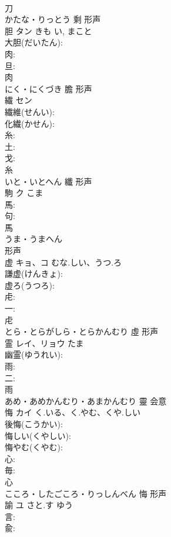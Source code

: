 \documentclass[8pt]{extreport}
\begin{document}
\begin{CJK}{UTF8}{min}
\\	刀	
\\	かたな・りっとう	剩	形声 
\\	胆	タン	きも	い, まこと	
\\	大胆(だいたん): 
\\	肉: 
\\	旦: 
\\	肉	
\\	にく・にくづき	膽	形声 
\\	繊	セン			
\\	繊維(せんい): 
\\	化繊(かせん): 
\\	糸: 
\\	土: 
\\	戈: 
\\	糸	
\\	いと・いとへん	纖	形声 
\\	駒	ク	こま		
\\	馬: 
\\	句: 
\\	馬	
\\	うま・うまへん	
\\	形声 
\\	虚	キョ、コ	むな.しい、うつ.ろ		
\\	謙虚(けんきょ): 
\\	虚ろ(うつろ): 
\\	虍: 
\\	一: 
\\	虍	
\\	とら・とらがしら・とらかんむり	虛	形声 
\\	霊	レイ、リョウ	たま		
\\	幽霊(ゆうれい): 
\\	雨: 
\\	二: 
\\	雨	
\\	あめ・あめかんむり・あまかんむり	靈	会意 
\\	悔	カイ	く.いる、く.やむ、くや.しい		
\\	後悔(こうかい): 
\\	悔しい(くやしい): 
\\	悔やむ(くやむ): 
\\	心: 
\\	毎: 
\\	心	
\\	こころ・したごころ・りっしんべん	悔	形声 
\\	諭	ユ	さと.す	ゆう	
\\	言: 
\\	兪: 

\end{CJK}
\end{document}
